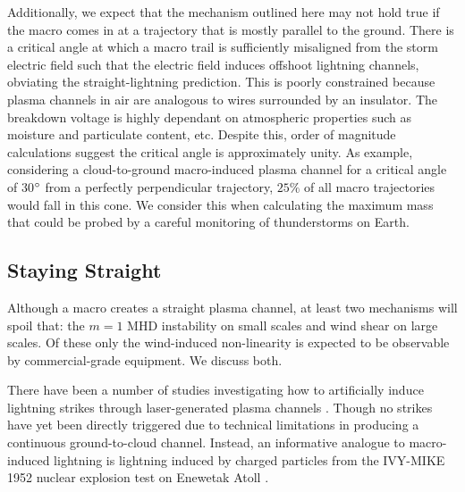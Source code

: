 \documentclass[%
 reprint,
 amsmath,amssymb,
 aps,
]{revtex4-2}
\begin{document}
        Additionally, we expect that the mechanism outlined here may not hold true if the macro comes in at a trajectory that is mostly parallel to the ground. There is a critical angle at which a macro trail is sufficiently misaligned from the storm electric field such that the electric field induces offshoot lightning channels, obviating the straight-lightning prediction. This is poorly constrained because plasma channels in air are analogous to wires surrounded by an insulator. The breakdown voltage is highly dependant on atmospheric properties such as moisture and particulate content, etc. Despite this, order of magnitude calculations suggest the critical angle is approximately unity. As example, considering a cloud-to-ground macro-induced plasma channel for a critical angle of 30$\degree$ from a perfectly perpendicular trajectory, $25\%$ of all macro trajectories would fall in this cone. We consider this when calculating the maximum mass that could be probed by a careful monitoring of thunderstorms on Earth.



    \subsection{Staying Straight} %
    \label{sub:staying_straight}

        Although a macro creates a straight plasma channel, at least two mechanisms will spoil that: the $m=1$ MHD instability on small scales and wind shear on large scales. Of these only the wind-induced non-linearity is expected to be observable by commercial-grade equipment. We discuss both.

        There have been a number of studies investigating how to artificially induce lightning strikes through laser-generated plasma channels \citep[see][]{Kasparian2008}. Though no strikes have yet been directly triggered due to technical limitations in producing a continuous ground-to-cloud channel. Instead, an informative analogue to macro-induced lightning is lightning induced by charged particles from the IVY-MIKE 1952 nuclear explosion test on Enewetak Atoll \citep{IVY-MIKE1987}. 
\end{document}
